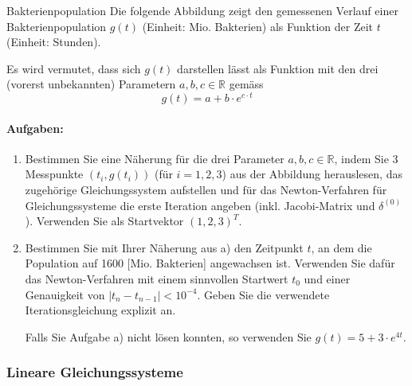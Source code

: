 \begin{example2}{Bakterienpopulation}
Die folgende Abbildung zeigt den gemessenen Verlauf einer Bakterienpopulation $g(t)$ (Einheit: Mio. Bakterien) als Funktion der Zeit $t$ (Einheit: Stunden).

Es wird vermutet, dass sich $g(t)$ darstellen lässt als Funktion mit den drei (vorerst unbekannten) Parametern $a, b, c \in \mathbb{R}$ gemäss
$$g(t) = a + b \cdot e^{c\cdot t}$$

\paragraph{Aufgaben:}
\begin{enumerate}
    \item Bestimmen Sie eine Näherung für die drei Parameter $a, b, c \in \mathbb{R}$, indem Sie 3 Messpunkte $(t_i, g(t_i))$ (für $i = 1, 2, 3$) aus der Abbildung herauslesen, das zugehörige Gleichungssystem aufstellen und für das Newton-Verfahren für Gleichungssysteme die erste Iteration angeben (inkl. Jacobi-Matrix und $\delta^{(0)}$). Verwenden Sie als Startvektor $(1, 2, 3)^T$.

    \item Bestimmen Sie mit Ihrer Näherung aus a) den Zeitpunkt $t$, an dem die Population auf 1600 [Mio. Bakterien] angewachsen ist. Verwenden Sie dafür das Newton-Verfahren mit einem sinnvollen Startwert $t_0$ und einer Genauigkeit von $|t_n - t_{n-1}| < 10^{-4}$. Geben Sie die verwendete Iterationsgleichung explizit an.

    Falls Sie Aufgabe a) nicht lösen konnten, so verwenden Sie $g(t) = 5 + 3 \cdot e^{4t}$.
\end{enumerate}
\end{example2}

\subsubsection{Lineare Gleichungssysteme}


